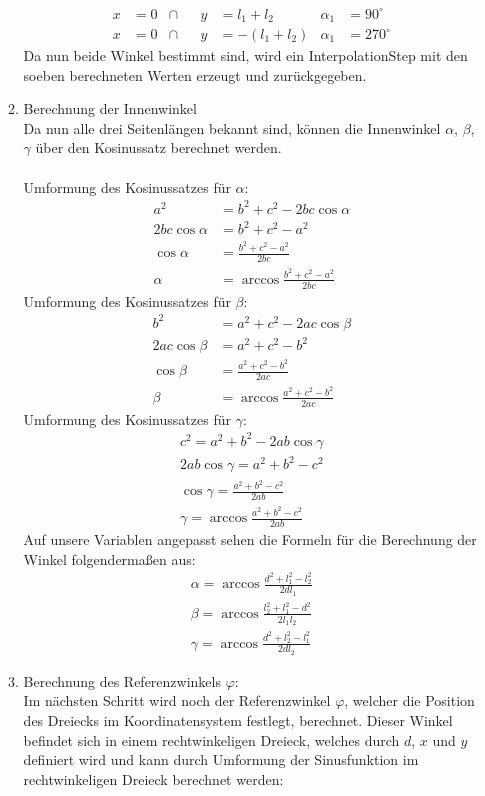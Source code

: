 \begin{itemize}
\begin{enumerate}
\begin{align*}
x & = 0 &\cap && y & = l_1+l_2 & \alpha_1 & = 90^\circ \\
x & = 0 &\cap && y & = -(l_1+l_2) & \alpha_1 & = 270^\circ
\end{align*}
Da nun beide Winkel bestimmt sind, wird ein InterpolationStep mit den soeben berechneten Werten erzeugt und zurückgegeben.
\newpage
\item Berechnung der Innenwinkel\\
Da nun alle drei Seitenlängen bekannt sind, können die Innenwinkel $\alpha$, $\beta$, $\gamma$ über den Kosinussatz berechnet werden.\\
\\
Umformung des Kosinussatzes für $\alpha$:
\begin{align*}
a^2 & = b^2 + c^2 - 2bc \cos \alpha \\
2bc \cos \alpha & = b^2 + c^2 - a^2 \\
\cos \alpha & = \frac{b^2 + c^2 - a^2}{2bc} \\
\alpha & = \arccos \frac{b^2 + c^2 - a^2}{2bc}
\end{align*}
Umformung des Kosinussatzes für $\beta$:
\begin{align*}
b^2 & = a^2 + c^2 - 2ac \cos \beta \\
2ac \cos \beta & = a^2 + c^2 - b^2 \\
\cos \beta & = \frac{a^2 + c^2 - b^2}{2ac} \\
\beta & = \arccos \frac{a^2 + c^2 - b^2}{2ac}
\end{align*}
Umformung des Kosinussatzes für $\gamma$:
\begin{align*}
c^2 = a^2 + b^2 - 2ab \cos \gamma \\
2ab \cos \gamma = a^2 + b^2 - c^2 \\
\cos \gamma = \frac{a^2 + b^2 - c^2}{2ab} \\
\gamma = \arccos \frac{a^2 + b^2 - c^2}{2ab}
\end{align*}
Auf unsere Variablen angepasst sehen die Formeln für die Berechnung der Winkel folgendermaßen aus:
\begin{align*}
\alpha = \arccos \frac{d^2 + l_1^2 - l_2^2}{2dl_1} \\
\beta = \arccos \frac{l_2^2 + l_1^2 - d^2}{2l_1l_2} \\
\gamma = \arccos \frac{d^2 + l_2^2 - l_1^2}{2dl_2}
\end{align*}
\newpage
\item Berechnung des Referenzwinkels $\varphi$:\\
Im nächsten Schritt wird noch der Referenzwinkel $\varphi$, welcher die Position des Dreiecks im Koordinatensystem festlegt, berechnet. Dieser Winkel befindet sich in einem rechtwinkeligen Dreieck, welches durch $d$, $x$ und $y$ definiert wird und kann durch Umformung der Sinusfunktion im rechtwinkeligen Dreieck berechnet werden:

\end{enumerate}
\end{itemize}

